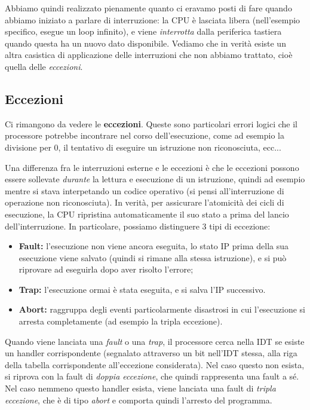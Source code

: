 \documentclass[a4paper,11pt]{article}
\begin{document}
Abbiamo quindi realizzato pienamente quanto ci eravamo posti di fare quando abbiamo iniziato a parlare di interruzione: la CPU è lasciata libera (nell'esempio specifico, esegue un loop infinito), e viene \textit{interrotta} dalla periferica tastiera quando questa ha un nuovo dato disponibile.
Vediamo che in verità esiste un altra casistica di applicazione delle interruzioni che non abbiamo trattato, cioè quella delle \textit{eccezioni}.

\subsection{Eccezioni}
Ci rimangono da vedere le \textbf{eccezioni}.
Queste sono particolari errori logici che il processore potrebbe incontrare nel corso dell'esecuzione, come ad esempio la divisione per 0, il tentativo di eseguire un istruzione non riconosciuta, ecc...

Una differenza fra le interruzioni esterne e le eccezioni è che le eccezioni possono essere sollevate \textit{durante} la lettura e esecuzione di un istruzione, quindi ad esempio mentre si stava interpetando un codice operativo (si pensi all'interruzione di operazione non riconosciuta).
In verità, per assicurare l'atomicità dei cicli di esecuzione, la CPU ripristina automaticamente il suo stato a prima del lancio dell'interruzione.
In particolare, possiamo distinguere 3 tipi di eccezione:
\begin{itemize}
	\item \textbf{Fault:} l'esecuzione non viene ancora eseguita, lo stato IP prima della sua esecuzione viene salvato (quindi si rimane alla stessa istruzione), e si può riprovare ad eseguirla dopo aver risolto l'errore;
	\item \textbf{Trap:} l'esecuzione ormai è stata eseguita, e si salva l'IP successivo.
	\item \textbf{Abort:} raggruppa degli eventi particolarmente disastrosi in cui l'esecuzione si arresta completamente (ad esempio la tripla eccezione).
\end{itemize}

Quando viene lanciata una \textit{fault} o una \textit{trap}, il processore cerca nella IDT se esiste un handler corrispondente (segnalato attraverso un bit nell'IDT stessa, alla riga della tabella corrispondente all'eccezione considerata).
Nel caso questo non esista, si riprova con la fault di \textit{doppia eccezione}, che quindi rappresenta una fault a sé.
Nel caso nemmeno questo handler esista, viene lanciata una fault di \textit{tripla eccezione}, che è di tipo \textit{abort} e comporta quindi l'arresto del programma.
\end{document}
